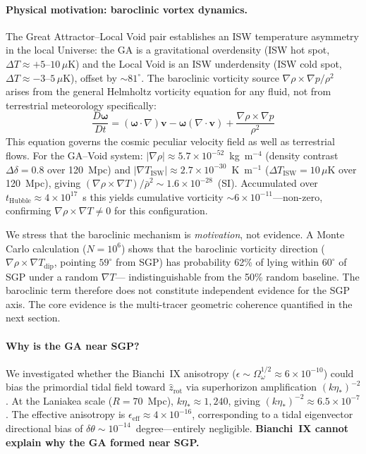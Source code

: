 \documentclass[12pt]{article}
\begin{document}
\paragraph{Physical motivation: baroclinic vortex dynamics.}
The Great Attractor--Local Void pair establishes an ISW temperature asymmetry in
the local Universe: the GA is a gravitational overdensity (ISW hot spot,
$\Delta T\approx+5$--$10\,\mu$K) and the Local Void is an ISW underdensity
(ISW cold spot, $\Delta T\approx-3$--$5\,\mu$K), offset by $\sim81^\circ$.
The baroclinic vorticity source $\nabla\rho\times\nabla p/\rho^2$ arises from the
general Helmholtz vorticity equation for any fluid, not from terrestrial meteorology
specifically:
\begin{equation}
  \frac{D\boldsymbol{\omega}}{Dt}
  = (\boldsymbol{\omega}\cdot\nabla)\mathbf{v}
    - \boldsymbol{\omega}(\nabla\cdot\mathbf{v})
    + \frac{\nabla\rho\times\nabla p}{\rho^2}
\end{equation}
This equation governs the cosmic peculiar velocity field \citep{Fujita1970,
DelSordo2011} as well as terrestrial flows. For the GA--Void system:
$|\nabla\rho|\approx5.7\times10^{-52}$~kg~m$^{-4}$ (density contrast $\Delta\delta=0.8$
over 120~Mpc) and
$|\nabla T_\mathrm{ISW}|\approx2.7\times10^{-30}$~K~m$^{-1}$
($\Delta T_\mathrm{ISW}=10\,\mu$K over 120~Mpc), giving
$(\nabla\rho\times\nabla T)/\bar{\rho}^2 \sim 1.6\times10^{-28}$~(SI).
Accumulated over $t_\mathrm{Hubble}\approx4\times10^{17}$~s this yields cumulative
vorticity $\sim6\times10^{-11}$---non-zero, confirming $\nabla\rho\times\nabla T\neq0$
for this configuration.

We stress that the baroclinic mechanism is \emph{motivation}, not evidence.
A Monte Carlo calculation ($N=10^6$) shows that the baroclinic vorticity direction
($\nabla\rho\times\nabla T_\mathrm{dip}$, pointing $59^\circ$ from SGP) has
probability 62\% of lying within $60^\circ$ of SGP under a random $\nabla T$---
indistinguishable from the 50\% random baseline. The baroclinic term therefore does
not constitute independent evidence for the SGP axis. The core evidence is the
multi-tracer geometric coherence quantified in the next section.

\paragraph{Why is the GA near SGP?}
We investigated whether the Bianchi~IX anisotropy
($\epsilon\sim\Omega_\omega^{1/2}\approx6\times10^{-10}$) could bias the primordial
tidal field toward $\hat{z}_\mathrm{rot}$ via superhorizon amplification
$(k\eta_*)^{-2}$. At the Laniakea scale ($R=70$~Mpc), $k\eta_*\approx1{,}240$,
giving $(k\eta_*)^{-2}\approx6.5\times10^{-7}$. The effective anisotropy is
$\epsilon_\mathrm{eff}\approx4\times10^{-16}$, corresponding to a tidal eigenvector
directional bias of $\delta\theta\sim10^{-14}$~degree---entirely negligible.
\textbf{Bianchi~IX cannot explain why the GA formed near SGP.}
\end{document}

